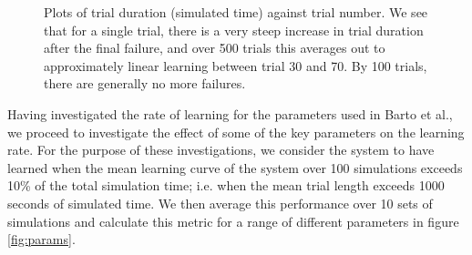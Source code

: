 \documentclass{article}
\begin{document}
\begin{figure}[h]
\begin{subfigure}[t]{0.30\linewidth}
		\label{fig:500trials}	
	\end{subfigure}
\caption{Plots of trial duration (simulated time) against trial number. We see that for a single trial, there is a very steep increase in trial duration after the final failure, and over 500 trials this averages out to approximately linear learning between trial 30 and 70. By 100 trials, there are generally no more failures.}
\label{fig:cartpole_learning}
\end{figure}

Having investigated the rate of learning for the parameters used in Barto et al., we proceed to investigate the effect of some of the key parameters on the learning rate. For the purpose of these investigations, we consider the system to have learned when the mean learning curve of the system over 100 simulations exceeds 10\% of the total simulation time; i.e. when the mean trial length exceeds 1000 seconds of simulated time. We then average this performance over 10 sets of simulations and calculate this metric for a range of different parameters in figure \ref{fig:params}.
\end{document}

